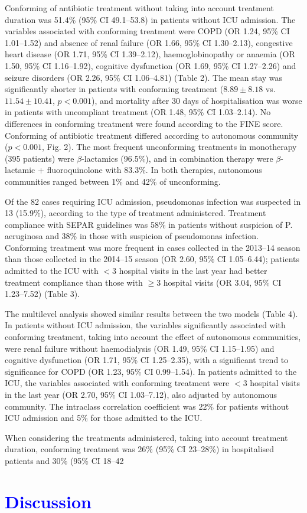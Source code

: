 \documentclass[11pt, a4paper]{article}
\begin{document}
\begin{multicols}{2}
Conforming of antibiotic treatment without taking into account treatment duration was 51.4\% (95\% CI 49.1–53.8) in patients without ICU admission. The variables associated with
conforming treatment were COPD (OR 1.24, 95\% CI 1.01–1.52) and absence of renal failure (OR 1.66, 95\% CI 1.30–2.13), congestive heart disease (OR 1.71, 95\% CI 1.39–2.12), haemoglobinopathy or anaemia (OR 1.50, 95\% CI 1.16–1.92), cognitive dysfunction (OR 1.69, 95\% CI 1.27–2.26) and seizure disorders (OR 2.26, 95\% CI 1.06–4.81) (Table 2). The mean stay was significantly shorter in patients with conforming treatment ($8.89 \pm 8.18$
vs. $11.54 \pm 10.41$, $p < 0.001$), and mortality after 30 days of hospitalisation
was worse in patients with uncompliant treatment (OR 1.48, 95\% CI 1.03–2.14). No differences in conforming treatment were found according to the FINE score. Conforming of antibiotic treatment differed according to autonomous community ($p < 0.001$, Fig. 2). The most frequent unconforming treatments in monotherapy (395 patients) were $\beta$-lactamics (96.5\%), and in combination therapy were $\beta$-lactamic + fluoroquinolone with 83.3\%. In both therapies, autonomous communities ranged between 1\% and 42\% of unconforming.

Of the 82 cases requiring ICU admission, pseudomonas infection was suspected in 13 (15.9\%), according to the type of treatment administered. Treatment compliance with SEPAR guidelines was 58\% in patients without suspicion of P. aeruginosa and 38\% in those with suspicion of pseudomonas infection. Conforming treatment was more frequent in cases collected in the 2013–14 season than those collected in the 2014–15 season (OR 2.60, 95\% CI 1.05–6.44); patients admitted to the ICU with $<3$ hospital visits in the last year had better treatment compliance than those with $\geq3$ hospital visits (OR 3.04, 95\% CI 1.23–7.52) (Table 3).

The multilevel analysis showed similar results between the two models (Table 4). In patients without ICU admission, the variables significantly associated with conforming treatment, taking into account the effect of autonomous communities, were renal failure without haemodialysis (OR 1.49, 95\% CI 1.15–1.95) and cognitive dysfunction (OR 1.71, 95\% CI 1.25–2.35), with a significant trend to significance for COPD (OR 1.23, 95\% CI 0.99–1.54). In patients admitted to the ICU, the variables associated with conforming treatment were $<3$ hospital visits in the last year (OR 2.70, 95\% CI 1.03–7.12), also adjusted by autonomous community. The intraclass correlation coefficient was 22\% for patients without ICU admission and 5\% for those admitted to the ICU.

When considering the treatments administered, taking into account treatment duration, conforming treatment was 26\% (95\% CI 23–28\%) in hospitalised patients and 30\% (95\% CI 18–42%

\section*{\textcolor{blue}{Discussion}}


\end{multicols}
\end{document}
